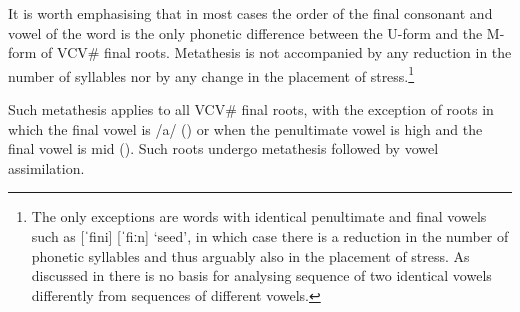 It is worth emphasising that in most cases the order
of the final consonant and vowel of the word is the only phonetic difference
between the U-form and the M-form of VCV{\#} final roots.
Metathesis is not accompanied by any reduction in the number of syllables
nor by any change in the placement of stress.\footnote{
		The only exceptions are words with identical penultimate
		and final vowels such as  [ˈfini] {\ra}  [ˈfiːn] `seed',
		in which case there is a reduction in the number of phonetic syllables
		and thus arguably also in the placement of stress.
		As discussed in 
		there is no basis for analysing sequence of two identical vowels
		differently from sequences of different vowels.}

Such metathesis applies to all VCV{\#} final roots,
with the exception of roots in which the final vowel is /a/ ()
or when the penultimate vowel is high and the final vowel is mid ().
Such roots undergo metathesis followed by vowel assimilation.

